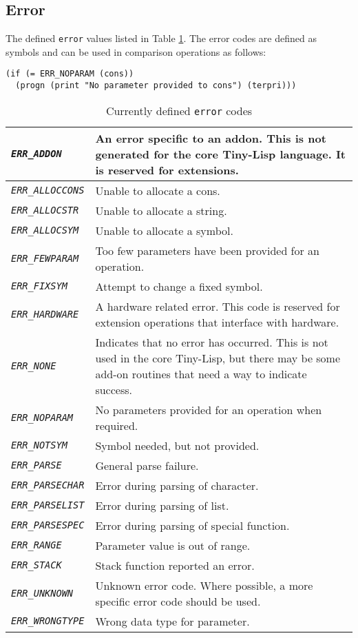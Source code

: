 \documentclass[10pt, openany]{book}
\newcommand{\constant}[1]{\emph{\texttt{#1}}}
\newcommand{\datatype}[1]{\texttt{#1}}
\newcommand{\tl}{Tiny-Lisp}
\begin{document}
\subsection{Error}
The defined \datatype{error} values listed in Table \ref{tbl:Error}.  The error codes are defined as symbols and can be used in comparison operations as follows:
\begin{lstlisting}
(if (= ERR_NOPARAM (cons))
  (progn (print "No parameter provided to cons") (terpri)))
\end{lstlisting}

\begin{table}
  \centering
  \caption{Currently defined \datatype{error} codes}
  \label{tbl:Error}
  \begin{tabular}{ l | p{12cm}}
    \hline
    \constant{ERR\_ADDON} & An error specific to an addon.  This is not generated for the core \tl{} language.  It is reserved for extensions.\\
    \hline
    \constant{ERR\_ALLOCCONS} & Unable to allocate a cons.\\
    \hline
    \constant{ERR\_ALLOCSTR} & Unable to allocate a string.\\
    \hline
    \constant{ERR\_ALLOCSYM} & Unable to allocate a symbol.\\
    \hline
    \constant{ERR\_FEWPARAM} & Too few parameters have been provided for an operation.\\
    \hline
    \constant{ERR\_FIXSYM} & Attempt to change a fixed symbol.\\
    \hline
    \constant{ERR\_HARDWARE} & A hardware related error.  This code is reserved for extension operations that interface with hardware.\\
    \hline
    \constant{ERR\_NONE} & Indicates that no error has occurred.  This is not used in the core \tl{}, but there may be some add-on routines that need a way to indicate success.\\
    \hline
    \constant{ERR\_NOPARAM} & No parameters provided for an operation when required.\\
    \hline
    \constant{ERR\_NOTSYM} &  Symbol needed, but not provided.\\
    \hline
    \constant{ERR\_PARSE} & General parse failure.\\
    \hline
    \constant{ERR\_PARSECHAR} & Error during parsing of character.\\
    \hline
    \constant{ERR\_PARSELIST} & Error during parsing of list.\\
    \hline
    \constant{ERR\_PARSESPEC} & Error during parsing of special function.\\
    \hline
    \constant{ERR\_RANGE} & Parameter value is out of range.\\
    \hline
    \constant{ERR\_STACK} & Stack function reported an error.\\
    \hline
    \constant{ERR\_UNKNOWN} & Unknown error code.  Where possible, a more specific error code should be used.\\
    \hline
    \constant{ERR\_WRONGTYPE} & Wrong data type for parameter.\\
    \hline
  \end{tabular}
\end{table}
\end{document}
